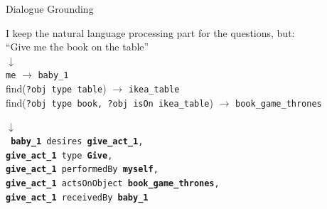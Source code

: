 \documentclass[compress]{beamer}
\begin{document}
{
\begin{frame}{Dialogue Grounding}
    \centering

    I keep the natural language processing part for the questions, but:\\

    \vspace*{2em}
    ``Give me the book on the table''\\

     {
        $\downarrow$\\
        {\tt me} $\rightarrow$ {\tt baby\_1} \\
        find({\tt\scriptsize ?obj type table}) $\rightarrow$ {\tt ikea\_table} \\
        find({\tt\scriptsize ?obj type book, ?obj isOn ikea\_table})
        $\rightarrow$ {\tt book\_game\_thrones} \\
    }

     {
        $\downarrow$\\
        { \tt
            \textbf{baby\_1} desires \textbf{give\_act\_1}, \\
            \textbf{give\_act\_1} type \textbf{Give}, \\
            \textbf{give\_act\_1} performedBy \textbf{myself}, \\
            \textbf{give\_act\_1} actsOnObject \textbf{book\_game\_thrones}, \\
            \textbf{give\_act\_1} receivedBy \textbf{baby\_1} \\
        }
    }
\end{frame}
}
\end{document}
